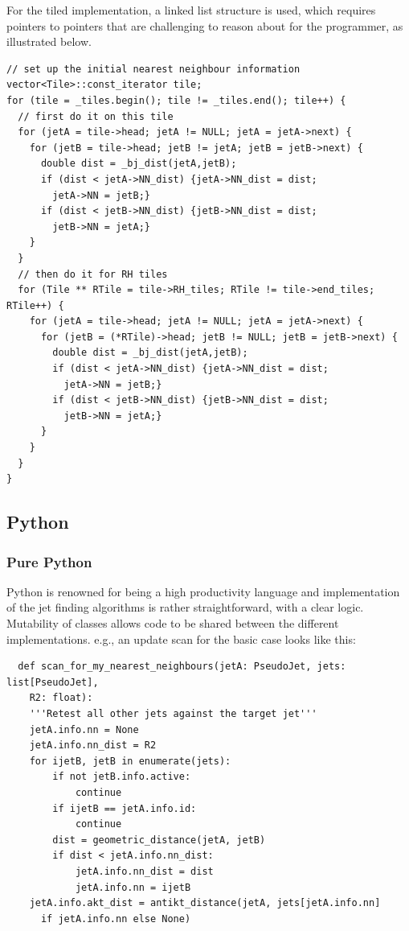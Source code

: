 \documentclass{webofc}
\begin{document}
For the tiled implementation, a linked list structure is used, which requires
pointers to pointers that are challenging to reason about for the programmer, as
illustrated below.

\begin{verbatim}
// set up the initial nearest neighbour information
vector<Tile>::const_iterator tile;
for (tile = _tiles.begin(); tile != _tiles.end(); tile++) {
  // first do it on this tile
  for (jetA = tile->head; jetA != NULL; jetA = jetA->next) {
    for (jetB = tile->head; jetB != jetA; jetB = jetB->next) {
      double dist = _bj_dist(jetA,jetB);
      if (dist < jetA->NN_dist) {jetA->NN_dist = dist; 
        jetA->NN = jetB;}
      if (dist < jetB->NN_dist) {jetB->NN_dist = dist; 
        jetB->NN = jetA;}
    }
  }
  // then do it for RH tiles
  for (Tile ** RTile = tile->RH_tiles; RTile != tile->end_tiles; RTile++) {
    for (jetA = tile->head; jetA != NULL; jetA = jetA->next) {
      for (jetB = (*RTile)->head; jetB != NULL; jetB = jetB->next) {
        double dist = _bj_dist(jetA,jetB);
        if (dist < jetA->NN_dist) {jetA->NN_dist = dist; 
          jetA->NN = jetB;}
        if (dist < jetB->NN_dist) {jetB->NN_dist = dist; 
          jetB->NN = jetA;}
      }
    }
  }
}
\end{verbatim}

\subsection{Python}
\label{sec:python-ergonomics}

\subsubsection{Pure Python}

Python is renowned for being a high productivity language and implementation of
the jet finding algorithms is rather straightforward, with a clear logic.
Mutability of classes allows code to be shared between the different
implementations. e.g., an update scan for the basic case looks like this:

\begin{verbatim}
  def scan_for_my_nearest_neighbours(jetA: PseudoJet, jets: list[PseudoJet], 
    R2: float):
    '''Retest all other jets against the target jet'''
    jetA.info.nn = None
    jetA.info.nn_dist = R2
    for ijetB, jetB in enumerate(jets):
        if not jetB.info.active:
            continue
        if ijetB == jetA.info.id:
            continue
        dist = geometric_distance(jetA, jetB)
        if dist < jetA.info.nn_dist:
            jetA.info.nn_dist = dist
            jetA.info.nn = ijetB
    jetA.info.akt_dist = antikt_distance(jetA, jets[jetA.info.nn] 
      if jetA.info.nn else None)
\end{verbatim}
\end{document}
